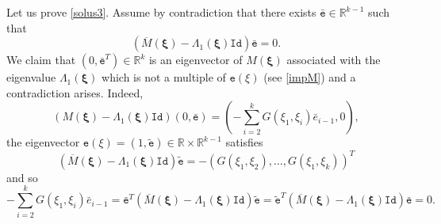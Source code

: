\documentclass[11pt,a4paper]{amsart}
\theoremstyle{definition}
\renewcommand{\(}{\left(}
\renewcommand{\)}{\right)}
\begin{document}
Let us prove \eqref{solus3}.
Assume by contradiction that there exists $\bar {\mathtt e}\in\mathbb R^{k-1}$ such that
$$\left(\overline M(\boldsymbol\xi)-\Lambda_1( \boldsymbol\xi) \mathtt {Id}\right)\bar {\mathtt e}=0.$$
We claim that $(0,\bar {\mathtt e}^T)\in\mathbb R^{k}$ is an eigenvector of $M(\boldsymbol\xi)$ associated with the eigenvalue $\Lambda_1( \boldsymbol\xi)$ which is not a multiple of ${\mathtt e}(\xi)$ (see \eqref{impM}) and a contradiction arises.
Indeed, 
$$\(M(\boldsymbol\xi)-\Lambda_1( \boldsymbol\xi) \mathtt {Id}\right)(0,\bar {\mathtt e})=(-\sum_{i=2}^k G(\xi_1,\xi_i)\bar e_{i-1},0),$$
the eigenvector  ${\mathtt e}(\xi)=(1,\tilde{\mathtt e})\in\mathbb R\times \mathbb R^{k-1}$ satisfies
$$ 
\(\overline M(\boldsymbol\xi)-\Lambda_1( \boldsymbol\xi) \mathtt {Id}\right)\tilde {\mathtt e}=-\(G(\xi_1,\xi_2) ,\dots,G(\xi_1,\xi_k)\)^T$$
and so
 $$ -\sum_{i=2}^k G(\xi_1,\xi_i)\bar e_{i-1}=\bar {\mathtt e}^T\(\overline M(\boldsymbol\xi)-\Lambda_1( \boldsymbol\xi) \mathtt {Id}\right)\tilde {\mathtt e}=\tilde {\mathtt e}^T\(\overline M(\boldsymbol\xi)-\Lambda_1( \boldsymbol\xi) \mathtt {Id}\right)\bar {\mathtt e}=0.$$
\end{document}
